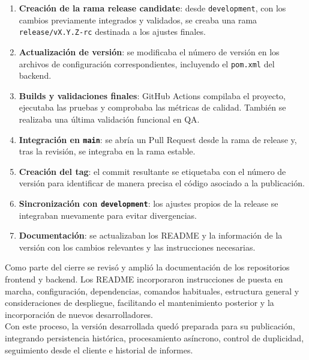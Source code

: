 \documentclass[11pt,a4paper,titlepage,oneside]{report}
\begin{document}
\begin{enumerate}

  \item \textbf{Creación de la rama release candidate}: desde
  \texttt{development}, con los cambios previamente integrados y validados, se
  creaba una rama \texttt{release/vX.Y.Z-rc} destinada a los ajustes finales.

  \item \textbf{Actualización de versión}: se modificaba el número de versión
  en los archivos de configuración correspondientes, incluyendo el
  \texttt{pom.xml} del backend.

  \item \textbf{Builds y validaciones finales}: GitHub Actions compilaba el
  proyecto, ejecutaba las pruebas y comprobaba las métricas de calidad. También
  se realizaba una última validación funcional en QA.

  \item \textbf{Integración en \texttt{main}}: se abría un Pull Request desde
  la rama de release y, tras la revisión, se integraba en la rama estable.

  \item \textbf{Creación del tag}: el commit resultante se etiquetaba con el
  número de versión para identificar de manera precisa el código asociado a la
  publicación.

  \item \textbf{Sincronización con \texttt{development}}: los ajustes propios
  de la release se integraban nuevamente para evitar divergencias.

  \item \textbf{Documentación}: se actualizaban los README y la información de
  la versión con los cambios relevantes y las instrucciones necesarias.

\end{enumerate}

Como parte del cierre se revisó y amplió la documentación de los repositorios
frontend y backend. Los README incorporaron instrucciones de puesta en marcha,
configuración, dependencias, comandos habituales, estructura general y
consideraciones de despliegue, facilitando el mantenimiento posterior y la
incorporación de nuevos desarrolladores. \\

Con este proceso, la versión desarrollada quedó preparada para su publicación,
integrando persistencia histórica, procesamiento asíncrono, control de
duplicidad, seguimiento desde el cliente e historial de informes.
\end{document}
